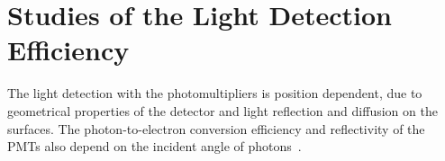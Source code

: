 \section{Studies of the Light Detection Efficiency}
\label{secLCE}

The light detection with the photomultipliers is position dependent, due to geometrical properties of the detector and light reflection and diffusion on the surfaces. The photon-to-electron conversion efficiency and reflectivity of the PMTs also depend on the incident angle of photons~\cite{PMTreflectance}.
